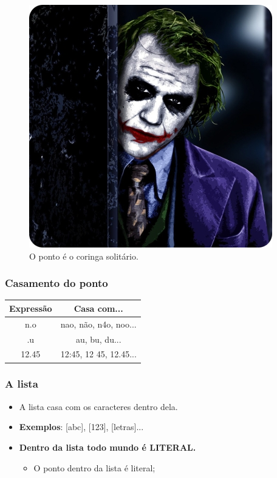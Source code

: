 \begin{frame}
	\begin{figure}
		\centering
		\includegraphics[height=0.8\textheight]{./imagens/re/sad_joker.jpeg}
		\caption{O ponto é o coringa solitário.}
	\end{figure}
\end{frame}

\begin{frame}
	\frametitle{Casamento do ponto}
	\begin{center}
		\begin{tabular}{ c | c }
		\textbf{Expressão}	& \textbf{Casa com...}		\\ \hline
		n.o			& nao, não, n4o, noo...  	\\ \hline
		.u			& au, bu, du...		 	\\ \hline
		12.45			& 12:45, 12 45, 12.45... 	\\ \hline
		\end{tabular}
	\end{center}

\end{frame}


\begin{frame}
	\frametitle{A lista}
	\begin{itemize}
		\item \Large{A lista casa com  os caracteres dentro dela.}
		\item \textbf{Exemplos}: [abc], [123], [letras]...
		\item \large{\bf Dentro da lista todo mundo é LITERAL.}
		\begin{itemize}
			\item O ponto dentro da lista é literal;
		\end{itemize}
	\end{itemize}
\end{frame}

